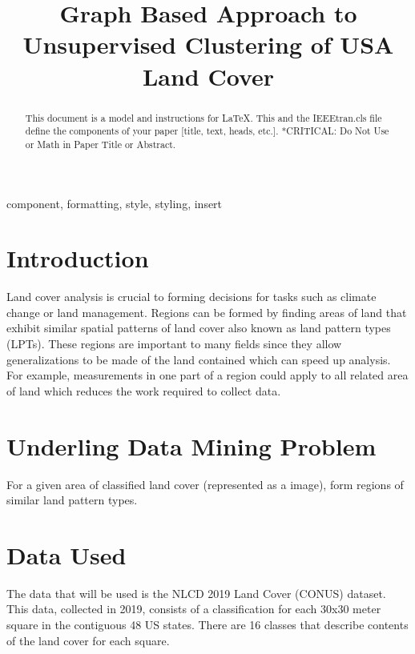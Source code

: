 \documentclass[journal,compsoc]{IEEEtran}
\begin{document}
\title{Graph Based Approach to Unsupervised Clustering of USA Land Cover}

\author{
}

\maketitle

\begin{abstract}
This document is a model and instructions for \LaTeX.
This and the IEEEtran.cls file define the components of your paper [title, text, heads, etc.]. *CRITICAL: Do Not Use %
or Math in Paper Title or Abstract.
\end{abstract}

\begin{IEEEkeywords}
component, formatting, style, styling, insert
\end{IEEEkeywords}

\section{Introduction}
Land cover analysis is crucial to forming decisions for tasks such as climate change or land management\cite{doi:10.1080/13658816.2015.1134796}. Regions can be formed by finding areas of land that exhibit similar spatial patterns of land cover also known as land pattern types (LPTs). These regions are important to many fields since they allow generalizations to be made of the land contained which can speed up analysis\cite{doi:10.1080/13658816.2015.1134796}. For example, measurements in one part of a region could apply to all related area of land which reduces the work required to collect data.

\section{Underling Data Mining Problem}
For a given area of classified land cover (represented as a image), form regions of similar land pattern types.

\section{Data Used}
The data that will be used is the NLCD 2019 Land Cover (CONUS) dataset. This data, collected in
2019, consists of a classification for each 30x30 meter square in the contiguous 48 US states.
There are 16 classes that describe contents of the land cover for each square. \cite{NLCD2019LandCover}
\end{document}
